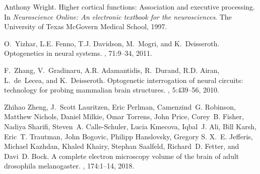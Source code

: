 \documentclass[letterpaper,11pt]{article}
\begin{document}
\begin{thebibliography}{100}
Anthony Wright.
\newblock Higher cortical functions: Association and executive processing.
\newblock In {\em Neuroscience Online: An electronic textbook for the
  neurosciences}. The University of Texas McGovern Medical School, 1997.

O.~Yizhar, L.E. Fenno, T.J. Davidson, M.~Mogri, and K.~Deisseroth.
\newblock Optogenetics in neural systems.
, 71:9--34, 2011.

F.~Zhang, V.~Gradinaru, A.R. Adamantidis, R.~Durand, R.D. Airan, L.~de~Lecea,
  and K.~Deisseroth.
\newblock Optogenetic interrogation of neural circuits: technology for probing
  mammalian brain structures.
, 5:439--56, 2010.

Zhihao Zheng, J.~Scott Lauritzen, Eric Perlman, Camenzind~G. Robinson, Matthew
  Nichols, Daniel Milkie, Omar Torrens, John Price, Corey~B. Fisher, Nadiya
  Sharifi, Steven~A. Calle-Schuler, Lucia Kmecova, Iqbal~J. Ali, Bill Karsh,
  Eric~T. Trautman, John Bogovic, Philipp Hanslovsky, Gregory S. X.~E.
  Jefferis, Michael Kazhdan, Khaled Khairy, Stephan Saalfeld, Richard~D.
  Fetter, and Davi~D. Bock.
\newblock A complete electron microscopy volume of the brain of adult
  drosophila melanogaster.
, 174:1--14, 2018.

\end{thebibliography}

\end{document}
